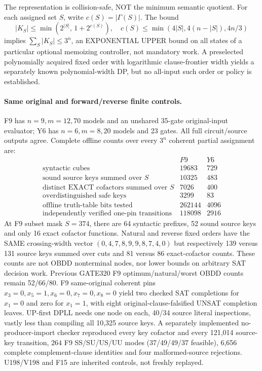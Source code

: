 \documentclass[11pt]{article}
\begin{document}
\noindent The representation is collision-safe, NOT the minimum semantic quotient. For each assigned set $S$, write $c(S)=|\Gamma(S)|$. The bound
\[
|K_S|\le\min(2^{|S|},\,1+2^{c(S)}),\quad
c(S)\le\min(4|S|,4(n-|S|),4n/3)
\]
implies $\sum_S|K_S|\le 3^n$, an EXPONENTIAL UPPER bound on all states of a particular optional memoizing controller, not mandatory work. A preselected polynomially acquired fixed order with logarithmic clause-frontier width yields a separately known polynomial-width DP, but no all-input such order or policy is established.
\paragraph{Same original and forward/reverse finite controls.}
F9 has $n=9,m=12,70$ models and an unshared 35-gate original-input evaluator; Y6 has $n=6,m=8,20$ models and 23 gates. All full circuit/source outputs agree. Complete offline counts over every $3^n$ coherent partial assignment are:
\[
\begin{array}{l|rr}
 & F9&Y6\\\hline
\text{syntactic cubes}&19683&729\\
\text{sound source keys summed over }S&10325&483\\
\text{distinct EXACT cofactors summed over }S&7026&400\\
\text{overdistinguished safe keys}&3299&83\\
\text{offline truth-table bits tested}&262144&4096\\
\text{independently verified one-pin transitions}&118098&2916
\end{array}
\]
At F9 subset mask $S=374$, there are 64 syntactic prefixes, 52 sound source keys and only 16 exact cofactor functions. Natural and reverse fixed orders have the SAME crossing-width vector $(0,4,7,8,9,9,8,7,4,0)$ but respectively 139 versus 131 source keys summed over cuts and 81 versus 86 exact-cofactor counts. These counts are not OBDD nonterminal nodes, nor lower bounds on arbitrary SAT decision work. Previous GATE320 F9 optimum/natural/worst OBDD counts remain 52/66/80.
F9 same-original coherent pins $x_3=0,x_5=1,x_6=0,x_7=0,x_8=0$ yield two checked SAT completions for $x_1=0$ and zero for $x_1=1$, with eight original-clause-falsified UNSAT completion leaves. UP-first DPLL needs one node on each, 40/34 source literal inspections, vastly less than compiling all 10,325 source keys. A separately implemented no-producer-import checker reproduced every key cofactor and every 121,014 source-key transition, $264$ F9 SS/SU/US/UU modes (37/49/49/37 feasible), 6,656 complete complement-clause identities and four malformed-source rejections. U198/V198 and F15 are inherited controls, not freshly replayed.
\end{document}

